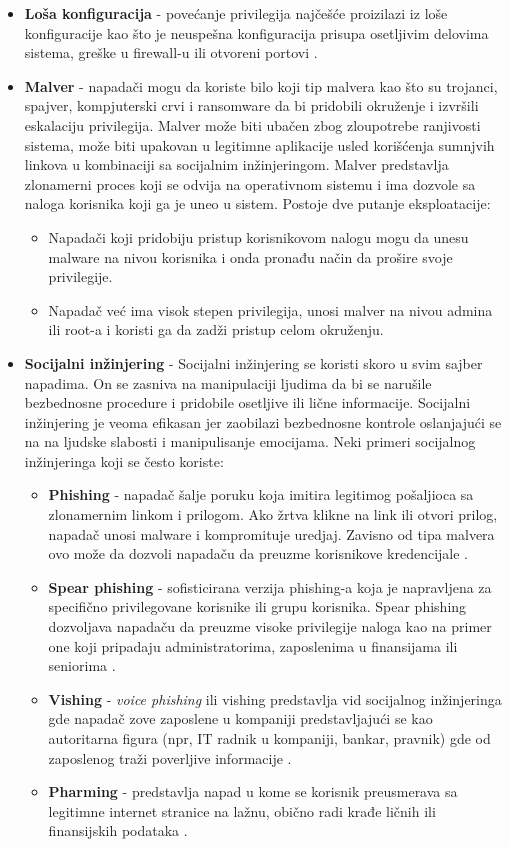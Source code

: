 \documentclass[a4paper,12pt]{article}
\begin{document}
\begin{itemize}
  \item \textbf{Loša konfiguracija} - povećanje privilegija najčešće proizilazi iz loše konfiguracije kao što je neuspešna konfiguracija prisupa osetljivim delovima sistema, greške u firewall-u ili otvoreni portovi \cite{privilege-escalation-2}. 
  \item \textbf{Malver} - napadači mogu da koriste bilo koji tip malvera kao što su trojanci, spajver, kompjuterski crvi i ransomware da bi pridobili okruženje i izvršili eskalaciju privilegija. Malver može biti ubačen zbog zloupotrebe ranjivosti sistema, može biti upakovan u legitimne aplikacije usled korišćenja sumnjvih linkova u kombinaciji sa socijalnim inžinjeringom. Malver predstavlja zlonamerni proces koji se odvija na operativnom sistemu i ima dozvole sa naloga korisnika koji ga je uneo u sistem. Postoje dve putanje eksploatacije:
  \begin{itemize}
    \item Napadači koji pridobiju pristup korisnikovom nalogu mogu da unesu malware na nivou korisnika i onda pronađu način da prošire svoje privilegije.
    \item Napadač već ima visok stepen privilegija, unosi malver na nivou admina ili root-a i koristi ga da zadži pristup celom okruženju.
  \end{itemize}

  \item \textbf{Socijalni inžinjering} - Socijalni inžinjering se koristi skoro u svim sajber napadima. On se zasniva na manipulaciji ljudima da bi se narušile bezbednosne procedure i pridobile osetljive ili lične informacije. Socijalni inžinjering je veoma efikasan jer zaobilazi bezbednosne kontrole oslanjajući se na na ljudske slabosti i manipulisanje emocijama. Neki primeri socijalnog inžinjeringa koji se često koriste: 
  \begin{itemize}
    \item \textbf{Phishing} - napadač šalje poruku koja imitira legitimog pošaljioca sa zlonamernim linkom i prilogom. Ako žrtva klikne na link ili otvori prilog, napadač unosi malware i kompromituje uredjaj. Zavisno od tipa malvera ovo može da dozvoli napadaču da preuzme korisnikove kredencijale \cite{privilege-escalation-2}. 
    \item \textbf{Spear phishing} - sofisticirana verzija phishing-a koja je napravljena za specifično privilegovane korisnike ili grupu korisnika. Spear phishing dozvoljava napadaču da preuzme visoke privilegije naloga kao na primer one koji pripadaju administratorima, zaposlenima u finansijama ili seniorima \cite{privilege-escalation-2}. 
    \item \textbf{Vishing} - \textit{voice phishing} ili vishing predstavlja vid socijalnog inžinjeringa gde napadač zove zaposlene u kompaniji predstavljajući se kao autoritarna figura (npr, IT radnik u kompaniji, bankar, pravnik) gde od zaposlenog traži poverljive informacije \cite{privilege-escalation-2}. 
    \item \textbf{Pharming} - predstavlja napad u kome se korisnik preusmerava sa legitimne internet stranice na lažnu, obično radi krađe ličnih ili finansijskih podataka \cite{privilege-escalation-2}. 


\end{itemize}
\end{itemize}
\end{document}
